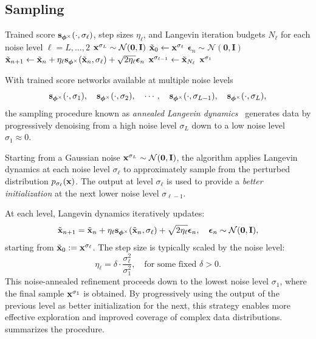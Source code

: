 \subsection{Sampling} 
\begin{algorithm}[th]
\caption{\label{alg:smld} Annealed Langevin Dynamics}
\begin{algorithmic}[1]
\Require Trained score ${\mathbf{s}}_{\bm{\phi}^\times}(\cdot, \sigma_\ell)$, step sizes $\eta_\ell$, and Langevin iteration budgets $N_\ell$ for each noise level $\ell = L, \dots, 2$
\State ${\mathbf{x}}^{\sigma_L} \sim \mathcal{N}(\mathbf{0}, \mathbf{I})$
    \State $\tilde{{\mathbf{x}}}_0 \gets {\mathbf{x}}^{\sigma_\ell}$
    \Statex{}
        \State $\bm{\epsilon}_n \sim \mathcal{N}(\mathbf{0}, \mathbf{I})$
        \State $\tilde{{\mathbf{x}}}_{n+1} \gets \tilde{{\mathbf{x}}}_n + \eta_\ell {\mathbf{s}}_{\bm{\phi}^\times}(\tilde{{\mathbf{x}}}_n, \sigma_\ell) + \sqrt{2\eta_\ell} \bm{\epsilon}_n$
    \EndFor
    \State ${\mathbf{x}}^{\sigma_{\ell-1}} \gets \tilde{{\mathbf{x}}}_{N_\ell}$
    \Statex {}
\EndFor
\Ensure ${\mathbf{x}}^{\sigma_1}$ 
\end{algorithmic}
\end{algorithm}


With trained score networks available at multiple noise levels
\[
{\mathbf{s}}_{\bm{\phi}^\times}(\cdot, \sigma_1), \quad{\mathbf{s}}_{\bm{\phi}^\times}(\cdot, \sigma_2), \quad \cdots, \quad {\mathbf{s}}_{\bm{\phi}^\times}(\cdot, \sigma_{L-1}), \quad    {\mathbf{s}}_{\bm{\phi}^\times}(\cdot, \sigma_L),
\]
the sampling procedure known as \emph{annealed Langevin dynamics}~\citep{song2019generative} generates data by progressively denoising from a high noise level $\sigma_L$ down to a low noise level $\sigma_1 \approx 0$.

Starting from a Gaussian noise ${\mathbf{x}}^{\sigma_L} \sim \mathcal{N}(\bm{0}, {\mathbf{I}})$, the algorithm applies Langevin dynamics at each noise level $\sigma_\ell$ to approximately sample from the perturbed distribution $p_{\sigma_\ell}({\mathbf{x}})$. The output at level $\sigma_\ell$ is used to provide a \emph{better initialization} at the next lower noise level $\sigma_{\ell-1}$.

At each level, Langevin dynamics iteratively updates:
\[
\tilde{{\mathbf{x}}}_{n+1} = \tilde{{\mathbf{x}}}_n + \eta_\ell {\mathbf{s}}_{\bm{\phi}^\times}(\tilde{{\mathbf{x}}}_n, \sigma_\ell) + \sqrt{2\eta_\ell} \bm{\epsilon}_n, \quad \bm{\epsilon}_n \sim \mathcal{N}(\bm{0}, {\mathbf{I}}),
\]
starting from $\tilde{{\mathbf{x}}}_0 := {\mathbf{x}}^{\sigma_\ell}$. The step size is typically scaled by the noise level:
\[
\eta_\ell = \delta \cdot \frac{\sigma_\ell^2}{\sigma_1^2}, \quad \text{for some fixed } \delta > 0.
\]
This noise-annealed refinement proceeds down to the lowest noise level $\sigma_1$, where the final sample ${\mathbf{x}}^{\sigma_1}$ is obtained. By progressively using the output of the previous level as better initialization for the next, this strategy enables more effective exploration and improved coverage of complex data distributions.  summarizes the procedure.


